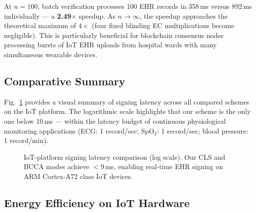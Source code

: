 \documentclass[conference]{IEEEtran}
\begin{document}
At $n=100$, batch verification processes 100 EHR records in 358\,ms
versus 892\,ms individually — a \textbf{2.49$\times$} speedup.
As $n \to \infty$, the speedup approaches the theoretical maximum
of $4\times$ (four fixed blinding EC multiplications become negligible).
This is particularly beneficial for blockchain consensus nodes
processing bursts of IoT EHR uploads from hospital wards with many
simultaneous wearable devices.

\subsection{Comparative Summary}

Fig.~\ref{fig:signing_bar} provides a visual summary of signing latency
across all compared schemes on the IoT platform. The logarithmic scale
highlights that our scheme is the only one below 10\,ms — within the
latency budget of continuous physiological monitoring applications
(ECG: 1 record/sec; SpO$_2$: 1 record/sec; blood pressure: 1 record/min).

\begin{figure}[htbp]
\centering
{}
\caption{IoT-platform signing latency comparison (log scale).
Our CLS and BCCA modes achieve $<$9\,ms, enabling real-time EHR
signing on ARM Cortex-A72 class IoT devices.}
\label{fig:signing_bar}
\end{figure}

\subsection{Energy Efficiency on IoT Hardware}
\end{document}
